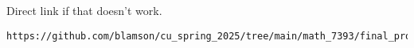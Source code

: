 \documentclass[12pt,a4paper]{report}
\begin{document}


\noindent Direct link if that doesn't work. 

\begin{verbatim}
https://github.com/blamson/cu_spring_2025/tree/main/math_7393/final_project
\end{verbatim}
\end{document}
